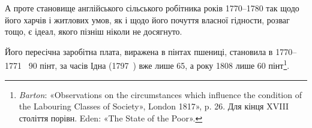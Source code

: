 А проте становище англійського сільського робітника років
1770--1780 так щодо його харчів і житлових умов, як і щодо
його почуття власної гідности, розваг тощо, є ідеал, якого пізніш
ніколи не досягнуто.

Його пересічна заробітна плата, виражена в пінтах пшениці,
становила в 1770--1771~ 90 пінт, за часів Ідна (1797~)
вже лише 65, а року 1808 лише 60 пінт\footnote{
\emph{Barton}: «Observations on the circumstances which influence the
condition of the Labouring Classes of Society», London 1817», p. 26. Для
кінця XVIII століття порівн. Eden: «The State of the Poor».
}.


